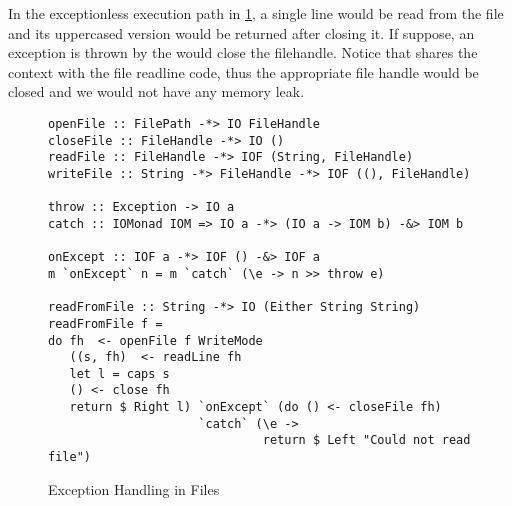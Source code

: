 In the exceptionless execution path in \cref{fig:file-exceptions}, a single line would be read from the file and its uppercased
version would be returned after closing it. If suppose, an exception is thrown by 
the  would close the filehandle. Notice that 
shares the context with the file readline code, thus the appropriate file handle would be closed and
we would not have any memory leak.

\begin{figure}[h]
  \begin{framed}
    \begin{verbatim}
openFile :: FilePath -*> IO FileHandle
closeFile :: FileHandle -*> IO ()
readFile :: FileHandle -*> IOF (String, FileHandle)
writeFile :: String -*> FileHandle -*> IOF ((), FileHandle)

throw :: Exception -> IO a
catch :: IOMonad IOM => IO a -*> (IO a -> IOM b) -&> IOM b

onExcept :: IOF a -*> IOF () -&> IOF a
m `onExcept` n = m `catch` (\e -> n >> throw e)

readFromFile :: String -*> IO (Either String String)
readFromFile f =
do fh  <- openFile f WriteMode
   ((s, fh)  <- readLine fh
   let l = caps s
   () <- close fh
   return $ Right l) `onExcept` (do () <- closeFile fh)
                     `catch` (\e ->
                              return $ Left "Could not read file")
    \end{verbatim}
  \end{framed}
  \caption{Exception Handling in Files}
  \label{fig:file-exceptions}
\end{figure}


